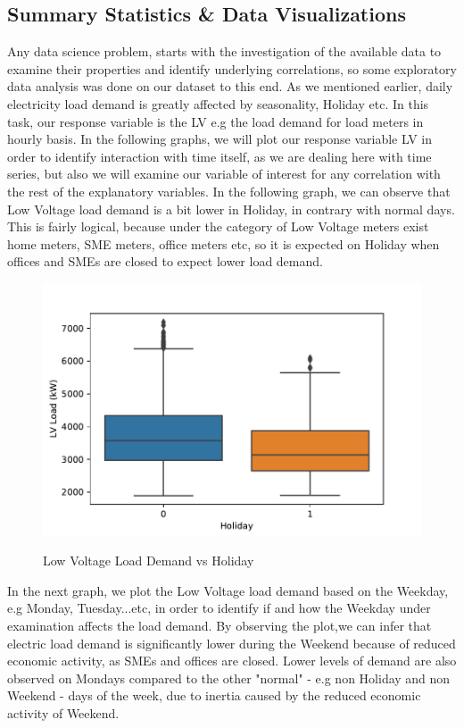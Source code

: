 \subsection{Summary Statistics \& Data Visualizations}
Any data science problem, starts with the investigation of the available data to examine their properties and identify underlying correlations, so some exploratory data analysis was done on our dataset to this end. As we mentioned earlier, daily electricity load demand is greatly affected by seasonality, Holiday etc. In this task, our response variable is the LV e.g the load demand for load meters in hourly basis. In the following graphs, we will plot our response variable LV in order to identify interaction with time itself, as we are dealing here with time series, but also we will examine our variable of interest for any correlation with the rest of the explanatory variables. In the following graph, we can observe that Low Voltage load demand is a bit lower in Holiday, in contrary with normal days. This is fairly logical, because under the category of Low Voltage meters exist home meters, SME meters, office meters etc, so it is expected on Holiday when offices and SMEs are closed to expect lower load demand.
\begin{figure}[h!]
\centering
\includegraphics[width=0.75\linewidth]{project/eda1.pdf}
\label{fig:felix}
\caption{Low Voltage Load Demand vs Holiday}
\end{figure}
\par In the next graph, we plot the Low Voltage load demand based on the Weekday, e.g Monday, Tuesday...etc, in order to identify if and how the Weekday under examination affects the load demand. By observing the plot,we can infer that electric load demand is significantly lower during the Weekend because of reduced economic activity, as SMEs and offices are closed. Lower levels of demand are also observed on Mondays compared to the other "normal" - e.g non Holiday and non Weekend - days of the week, due to inertia caused by the reduced economic activity of Weekend.
